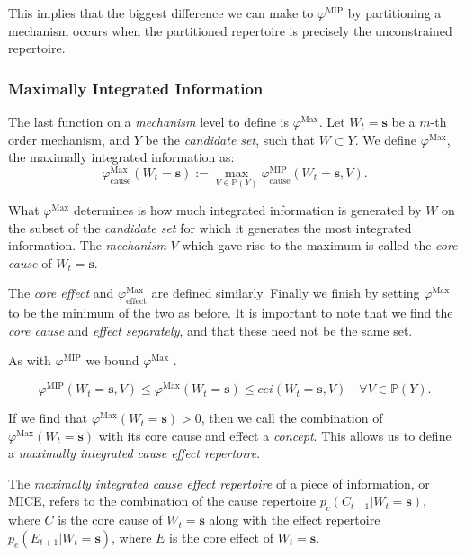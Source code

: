 This implies that the biggest difference we can make to $\varphi^{\text{MIP}}$ by partitioning a mechanism occurs when the partitioned repertoire is precisely the unconstrained repertoire. 



\subsubsection{Maximally Integrated Information}
The last function on a \textit{mechanism} level to define is $\varphi^{\text{Max}}$. Let $W_t = \mathbf{s}$ be a $m$-th order mechanism, and $Y$ be the \textit{candidate set}, such that $W \subset Y$. We define $\varphi^{\text{Max}}$, the maximally integrated information \cite{oizumi2014phenomenology} as: 
\begin{equation}
\label{def:core_cause}
\varphi^{\text{Max}}_{\text{cause}}(W_t = \mathbf{s}):=\max \limits_{V \in \mathbb{P}(Y)}\varphi^{\text{MIP}}_{\text{cause}}(W_t = \mathbf{s}, V).
\end{equation}

What $\varphi^{\text{Max}}$ determines is how much integrated information is generated by $W$ on the subset of the \textit{candidate set} for which it generates the most integrated information. The \textit{mechanism} $V$ which gave rise to the maximum is called the \textit{core cause} of $W_t = \mathbf{s}$.

The \textit{core effect} and  $\varphi^{\text{Max}}_{\text{effect}}$ are defined similarly. Finally we finish  by setting $\varphi^{\text{Max}}$ to be the minimum of the two as before. It is important to note that we find the \textit{core cause} and \textit{effect separately}, and that these need not be the same set.

As with $\varphi^{\text{MIP}}$ we bound $\varphi^{\text{Max}}$ \cite{marshall2016integrated}. 

\begin{equation}
\label{eq:bound_phimax}
\varphi^{\text{MIP}}(W_t = \mathbf{s}, V) \leq \varphi^{\text{Max}}(W_t = \mathbf{s})\leq cei(W_t = \mathbf{s}, V) \quad \forall V \in \mathbb{P}(Y).
\end{equation}

If we find that $\varphi^{\text{Max}}(W_t =\mathbf{s})>0$, then we call the combination of $\varphi^{\text{Max}}(W_t = \mathbf{s})$ with its core cause and effect a \textit{concept}. This allows us to define a \textit{maximally integrated cause effect repertoire}.

\begin{definition}
	{The \textit{maximally integrated cause effect repertoire} of a piece of information, or MICE, refers to the combination of the cause repertoire $p_c(C_{t-1}|W_t = \mathbf{s})$, where $C$ is the core cause of $W_t=\mathbf{s}$ along with the effect repertoire $p_e(E_{t+1}|W_t = \mathbf{s})$, where $E$ is the core effect of $W_t = \mathbf{s}$.}
\end{definition}

